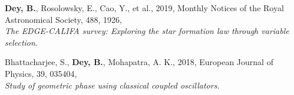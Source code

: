 
    \item \textbf{Dey, B.}, Rosolowsky, E., Cao, Y., et al., 2019, Monthly Notices of the Royal Astronomical Society, 488, 1926, \\ \textit{The EDGE-CALIFA survey: Exploring the star formation law through variable selection}.
    

   \item Bhattacharjee, S.,\textbf{ Dey, B.}, Mohapatra, A. K., 2018, European Journal of Physics, 39, 035404, \\ \textit{Study of geometric phase using classical coupled oscillators}. 
   



   